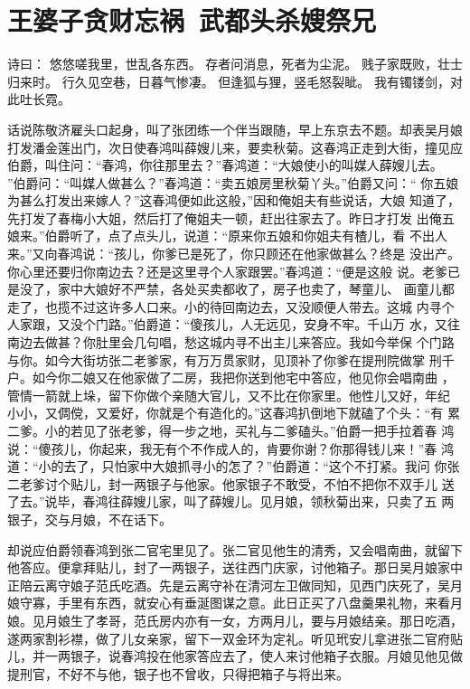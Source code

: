 \chapter{王婆子贪财忘祸~武都头杀嫂祭兄}

诗曰：
悠悠嗟我里，世乱各东西。
存者问消息，死者为尘泥。
贱子家既败，壮士归来时。
行久见空巷，日暮气惨凄。
但逢狐与狸，竖毛怒裂眦。
我有镯镂剑，对此吐长霓。

话说陈敬济雇头口起身，叫了张团练一个伴当跟随，早上东京去不题。却表吴月娘
打发潘金莲出门，次日使春鸿叫薛嫂儿来，要卖秋菊。这春鸿正走到大街，撞见应
伯爵，叫住问：“春鸿，你往那里去？”春鸿道：“大娘使小的叫媒人薛嫂儿去。
”伯爵问：“叫媒人做甚么？”春鸿道：“卖五娘房里秋菊丫头。”伯爵又问：“
你五娘为甚么打发出来嫁人？”这春鸿便如此这般，”因和俺姐夫有些说话，大娘
知道了，先打发了春梅小大姐，然后打了俺姐夫一顿，赶出往家去了。昨日才打发
出俺五娘来。”伯爵听了，点了点头儿，说道：“原来你五娘和你姐夫有楂儿，看
不出人来。”又向春鸿说：“孩儿，你爹已是死了，你只顾还在他家做甚么？终是
没出产。你心里还要归你南边去？还是这里寻个人家跟罢。”春鸿道：“便是这般
说。老爹已是没了，家中大娘好不严禁，各处买卖都收了，房子也卖了，琴童儿、
画童儿都走了，也揽不过这许多人口来。小的待回南边去，又没顺便人带去。这城
内寻个人家跟，又没个门路。”伯爵道：“傻孩儿，人无远见，安身不牢。千山万
水，又往南边去做甚？你肚里会几句唱，愁这城内寻不出主儿来答应。我如今举保
个门路与你。如今大街坊张二老爹家，有万万贯家财，见顶补了你爹在提刑院做掌
刑千户。如今你二娘又在他家做了二房，我把你送到他宅中答应，他见你会唱南曲
，管情一箭就上垛，留下你做个亲随大官儿，又不比在你家里。他性儿又好，年纪
小小，又倜傥，又爱好，你就是个有造化的。”这春鸿扒倒地下就磕了个头：“有
累二爹。小的若见了张老爹，得一步之地，买礼与二爹磕头。”伯爵一把手拉着春
鸿说：“傻孩儿，你起来，我无有个不作成人的，肯要你谢？你那得钱儿来！”春
鸿道：“小的去了，只怕家中大娘抓寻小的怎了？”伯爵道：“这个不打紧。我问
你张二老爹讨个贴儿，封一两银子与他家。他家银子不敢受，不怕不把你不双手儿
送了去。”说毕，春鸿往薛嫂儿家，叫了薛嫂儿。见月娘，领秋菊出来，只卖了五
两银子，交与月娘，不在话下。

却说应伯爵领春鸿到张二官宅里见了。张二官见他生的清秀，又会唱南曲，就留下
他答应。便拿拜贴儿，封了一两银子，送往西门庆家，讨他箱子。那日吴月娘家中
正陪云离守娘子范氏吃酒。先是云离守补在清河左卫做同知，见西门庆死了，吴月
娘守寡，手里有东西，就安心有垂涎图谋之意。此日正买了八盘羹果礼物，来看月
娘。见月娘生了孝哥，范氏房内亦有一女，方两月儿，要与月娘结亲。那日吃酒，
遂两家割衫襟，做了儿女亲家，留下一双金环为定礼。听见玳安儿拿进张二官府贴
儿，并一两银子，说春鸿投在他家答应去了，使人来讨他箱子衣服。月娘见他见做
提刑官，不好不与他，银子也不曾收，只得把箱子与将出来。

